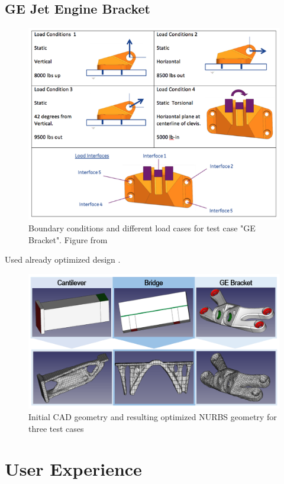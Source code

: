 \subsection{GE Jet Engine Bracket}
\begin{figure}[H]
\begin{center}
\includegraphics[width=\textwidth]{Pictures/GEbracket.png}
\end{center}
\caption{Boundary conditions and different load cases for test case "GE Bracket". Figure from \cite{GEBracket}}
\end{figure}
Used already optimized design \cite{GEBracketTripon}.


\begin{figure}
\begin{center}
\includegraphics[width = \textwidth]{Pictures/TestCases.png}
\end{center}
\caption{Initial CAD geometry and resulting optimized NURBS geometry for three test cases}
\end{figure}

\section{User Experience}
\label{sec:uex}
